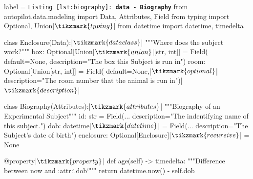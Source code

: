 \begin{listing}[h!]
\begin{pythoncode*}{label = \texttt{Listing \ref{lst:biography}: \textbf{data - Biography}}}
from autopilot.data.modeling import Data, Attributes, Field
from typing import Optional, Union|$\tikzmark{typing}$|
from datetime import datetime, timedelta

class Enclosure(Data):|$\tikzmark{dataclass}$|
    """Where does the subject work?"""
    box:  Optional[Union|$\tikzmark{union}$|[str, int]] = Field(
        default=None,
        description="The box this Subject is run in")
    room: Optional[Union[str, int]] = Field(
        default=None,|$\tikzmark{optional}$|
        description="The room number that the animal is run in")|$\tikzmark{description}$|

class Biography(Attributes):|$\tikzmark{attributes}$|
    """Biography of an Experimental Subject"""
    id:  str = Field(...
        description="The indentifying name of this subject.")
    dob: datetime|$\tikzmark{datetime}$| = Field(... 
        description="The Subject's date of birth")
    enclosure: Optional[Enclosure]|$\tikzmark{recursive}$| = None

    @property|$\tikzmark{property}$|
    def age(self) -> timedelta:
        """Difference between now and :attr:`.dob`"""
        return datetime.now() - self.dob
\end{pythoncode*}
\captionlistentry{}%
\label{lst:biography}%
\end{listing}%
%
